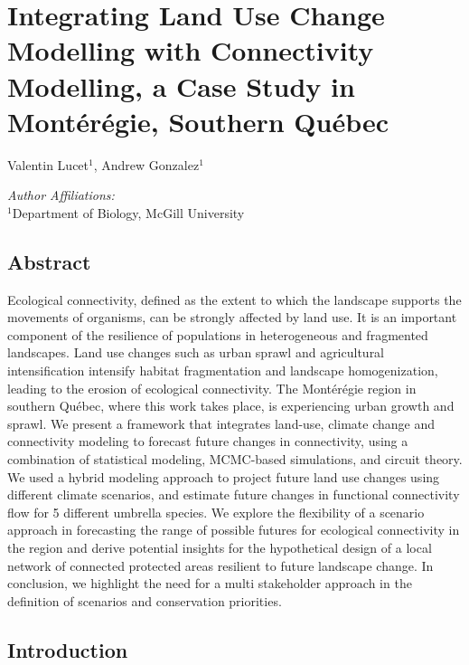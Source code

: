 \chapter{Integrating Land Use Change Modelling with Connectivity Modelling, a Case Study in Montérégie, Southern Québec}
\begin{center}
{Valentin Lucet$^{1}$, Andrew Gonzalez$^{1}$}\\
\end{center}
\textit{Author Affiliations:}\\
\normalsize{$^{1}$Department of Biology, McGill University}\\

\newrefsection

\section{Abstract}

Ecological connectivity, defined as the extent to which the landscape supports the movements of organisms, can be strongly affected by land use. It is an important component of the resilience of populations in heterogeneous and fragmented landscapes. Land use changes such as urban sprawl and agricultural intensification intensify habitat fragmentation and landscape homogenization, leading to the erosion of ecological connectivity. The Montérégie region in southern Québec, where this work takes place, is experiencing urban growth and sprawl. We present a framework that integrates land-use, climate change and connectivity modeling to forecast future changes in connectivity, using a combination of statistical modeling, MCMC-based simulations, and circuit theory. We used a hybrid modeling approach to project future land use changes using different climate scenarios, and estimate future changes in functional connectivity flow for 5 different umbrella species. We explore the flexibility of a scenario approach in forecasting the range of possible futures for ecological connectivity in the region and derive potential insights for the hypothetical design of a local network of connected protected areas resilient to future landscape change. In conclusion, we highlight the need for a multi stakeholder approach in the definition of scenarios and conservation priorities.\\

\newpage

\section{Introduction}
\vspace{2em}

